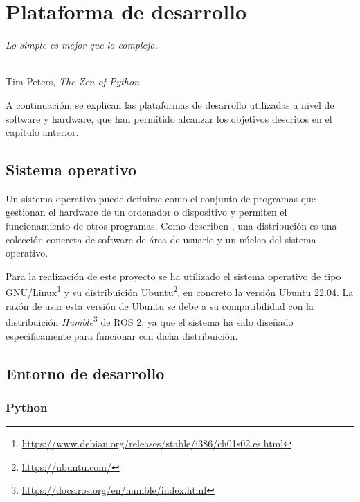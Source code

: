 \chapter{Plataforma de desarrollo}
\label{cap:capitulo3}

\begin{flushright}
\begin{minipage}[]{6.5cm}
\emph{Lo simple es mejor que lo complejo.}\\
\end{minipage}\\

Tim Peters, \textit{The Zen of Python}\\
\end{flushright}

\vspace{1cm}
\setcounter{footnote}{1}

A continuación, se explican las plataformas de desarrollo utilizadas a nivel de software y hardware, que han permitido alcanzar los objetivos descritos en el capítulo anterior.

\section{Sistema operativo}
\label{sec:distribuicion}

Un sistema operativo puede definirse como el conjunto de programas que gestionan el hardware de un ordenador o dispositivo y permiten el funcionamiento de otros programas.
Como describen \cite{perales9a}, una distribución es una colección concreta de software de área de usuario y un núcleo del sistema operativo.

Para la realización de este proyecto se ha utilizado el sistema operativo de tipo GNU/Linux\footnote{\url{https://www.debian.org/releases/stable/i386/ch01s02.es.html}} y su distribuición Ubuntu\footnote{\url{https://ubuntu.com/}}, en concreto la versión Ubuntu 22.04.
La razón de usar esta versión de Ubuntu se debe a su compatibilidad con la distribuición \textit{Humble}\footnote{\url{https://docs.ros.org/en/humble/index.html}} de ROS 2, ya que el sistema ha sido diseñado específicamente para funcionar con dicha distribuición.

\section{Entorno de desarrollo}
\label{sec:entornos}

\subsection{Python}
\label{sec:entornos}

